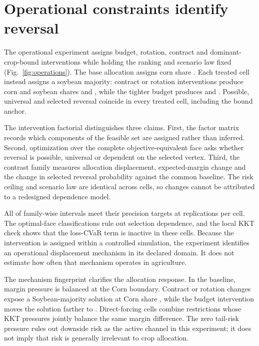 \section{Operational constraints identify reversal}

The operational experiment assigns budget, rotation, contract and dominant-crop-bound interventions while holding the ranking and scenario law fixed (Fig.~\ref{fig:operations}). The base allocation assigns corn share \EtwoBaseCorn{}. Each treated cell instead assigns a soybean majority: contract or rotation interventions produce corn and soybean shares \EtwoForcedCorn{} and \EtwoForcedSoy{}, while the tighter budget produces \EtwoBudgetCorn{} and \EtwoBudgetSoy{}. Possible, universal and selected reversal coincide in every treated cell, including the bound anchor.

The intervention factorial distinguishes three claims. First, the factor matrix records which components of the feasible set are assigned rather than inferred. Second, optimization over the complete objective-equivalent face asks whether reversal is possible, universal or dependent on the selected vertex. Third, the contrast family measures allocation displacement, expected-margin change and the change in selected reversal probability against the common baseline. The risk ceiling and scenario law are identical across cells, so changes cannot be attributed to a redesigned dependence model.

All \EtwoPassedIntervals{} of \EtwoIntervals{} family-wise intervals meet their precision targets at \EtwoReplications{} replications per cell. The optimal-face classifications rule out selection dependence, and the local KKT check shows that the loss-CVaR term is inactive in these cells. Because the intervention is assigned within a controlled simulation, the experiment identifies an operational displacement mechanism in its declared domain. It does not estimate how often that mechanism operates in agriculture.

The mechanism fingerprint clarifies the allocation response. In the baseline, margin pressure is balanced at the Corn boundary. Contract or rotation changes expose a Soybean-majority solution at Corn share \EtwoForcedCorn{}, while the budget intervention moves the solution farther to \EtwoBudgetCorn{}. Direct-forcing cells combine restrictions whose KKT pressures jointly balance the same margin difference. The zero tail-risk pressure rules out downside risk as the active channel in this experiment; it does not imply that risk is generally irrelevant to crop allocation.

